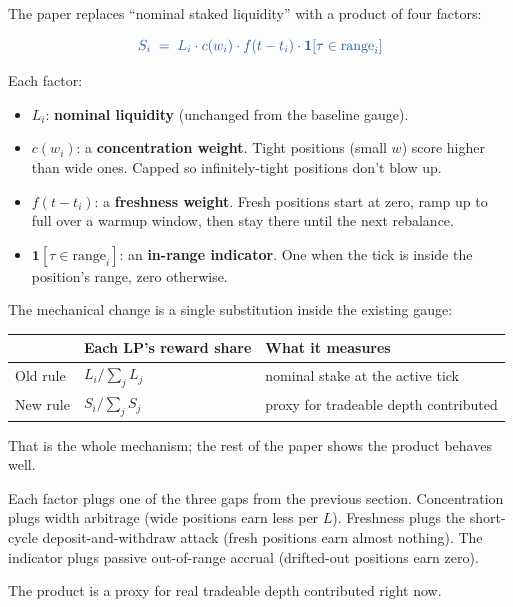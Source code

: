 \documentclass[11pt,a4paper]{article}
\begin{document}
The paper replaces ``nominal staked liquidity'' with a product of four factors:

\begin{result}
\[
\textcolor{ikey}{\;S_i \;=\; L_i \cdot c(w_i) \cdot f(t - t_i) \cdot \mathbf{1}[\tau \in \text{range}_i]\;}
\]
\end{result}

Each factor:

\begin{itemize}[leftmargin=2em]
\item $L_i$: \textbf{nominal liquidity} (unchanged from the baseline gauge).
\item $c(w_i)$: a \textbf{concentration weight}. Tight positions (small $w$) score higher than wide ones. Capped so infinitely-tight positions don't blow up.
\item $f(t - t_i)$: a \textbf{freshness weight}. Fresh positions start at zero, ramp up to full over a warmup window, then stay there until the next rebalance.
\item $\mathbf{1}[\tau \in \text{range}_i]$: an \textbf{in-range indicator}. One when the tick is inside the position's range, zero otherwise.
\end{itemize}

The mechanical change is a single substitution inside the existing gauge:

\begin{center}
\small
\begin{tabular}{@{}lll@{}}
\toprule
 & Each LP's reward share & What it measures \\
\midrule
Old rule & $L_i / \sum_j L_j$ & nominal stake at the active tick \\
New rule & $S_i / \sum_j S_j$ & proxy for tradeable depth contributed \\
\bottomrule
\end{tabular}
\end{center}

That is the whole mechanism; the rest of the paper shows the product behaves well.

\begin{intuition}
Each factor plugs one of the three gaps from the previous section. Concentration plugs width arbitrage (wide positions earn less per $L$). Freshness plugs the short-cycle deposit-and-withdraw attack (fresh positions earn almost nothing). The indicator plugs passive out-of-range accrual (drifted-out positions earn zero).

The product is a proxy for real tradeable depth contributed right now.
\end{intuition}
\end{document}

